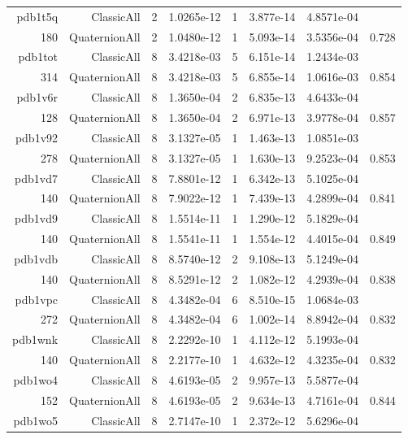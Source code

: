 \begin{xltabular}{\textwidth}{r|rcS[table-format=1.4e+2]cS[table-format=1.3e+2]S[table-format=1.4e+2]S[table-format=-1.3]}
pdb1t5q & ClassicAll & 2 & 1.0265e-12 & 1 & 3.877e-14 & 4.8571e-04 & \\
180 & QuaternionAll & 2 & 1.0480e-12 & 1 & 5.093e-14 & 3.5356e-04 & 0.728\\  \addlinespace
pdb1tot & ClassicAll & 8 & 3.4218e-03 & 5 & 6.151e-14 & 1.2434e-03 & \\
314 & QuaternionAll & 8 & 3.4218e-03 & 5 & 6.855e-14 & 1.0616e-03 & 0.854\\  \addlinespace
pdb1v6r & ClassicAll & 8 & 1.3650e-04 & 2 & 6.835e-13 & 4.6433e-04 & \\
128 & QuaternionAll & 8 & 1.3650e-04 & 2 & 6.971e-13 & 3.9778e-04 & 0.857\\  \addlinespace
pdb1v92 & ClassicAll & 8 & 3.1327e-05 & 1 & 1.463e-13 & 1.0851e-03 & \\
278 & QuaternionAll & 8 & 3.1327e-05 & 1 & 1.630e-13 & 9.2523e-04 & 0.853\\  \addlinespace
pdb1vd7 & ClassicAll & 8 & 7.8801e-12 & 1 & 6.342e-13 & 5.1025e-04 & \\
140 & QuaternionAll & 8 & 7.9022e-12 & 1 & 7.439e-13 & 4.2899e-04 & 0.841\\  \addlinespace
pdb1vd9 & ClassicAll & 8 & 1.5514e-11 & 1 & 1.290e-12 & 5.1829e-04 & \\
140 & QuaternionAll & 8 & 1.5541e-11 & 1 & 1.554e-12 & 4.4015e-04 & 0.849\\  \addlinespace
pdb1vdb & ClassicAll & 8 & 8.5740e-12 & 2 & 9.108e-13 & 5.1249e-04 & \\
140 & QuaternionAll & 8 & 8.5291e-12 & 2 & 1.082e-12 & 4.2939e-04 & 0.838\\  \addlinespace
pdb1vpc & ClassicAll & 8 & 4.3482e-04 & 6 & 8.510e-15 & 1.0684e-03 & \\
272 & QuaternionAll & 8 & 4.3482e-04 & 6 & 1.002e-14 & 8.8942e-04 & 0.832\\  \addlinespace
pdb1wnk & ClassicAll & 8 & 2.2292e-10 & 1 & 4.112e-12 & 5.1993e-04 & \\
140 & QuaternionAll & 8 & 2.2177e-10 & 1 & 4.632e-12 & 4.3235e-04 & 0.832\\  \addlinespace
pdb1wo4 & ClassicAll & 8 & 4.6193e-05 & 2 & 9.957e-13 & 5.5877e-04 & \\
152 & QuaternionAll & 8 & 4.6193e-05 & 2 & 9.634e-13 & 4.7161e-04 & 0.844\\  \addlinespace
pdb1wo5 & ClassicAll & 8 & 2.7147e-10 & 1 & 2.372e-12 & 5.6296e-04 & \\

\end{xltabular}
